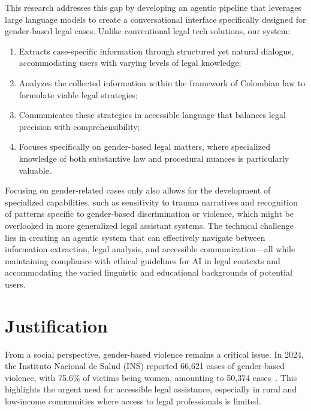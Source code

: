 This research addresses this gap by developing an agentic pipeline 
that leverages large language models to create a conversational 
interface specifically designed for gender-based legal cases. 
Unlike conventional legal tech solutions, our system:
\begin{enumerate}
\item Extracts case-specific information through structured yet natural dialogue, accommodating users with varying levels of legal knowledge;
\item Analyzes the collected information within the framework of Colombian law to formulate viable legal strategies;
\item Communicates these strategies in accessible language that balances legal precision with comprehensibility;
\item Focuses specifically on gender-based legal matters, where specialized knowledge of both substantive law and procedural nuances is particularly valuable.
\end{enumerate}
Focusing on gender-related cases only also allows for the development of specialized capabilities, 
such as sensitivity to trauma narratives and recognition of patterns specific to 
gender-based discrimination or violence, which might be overlooked in more generalized 
legal assistant systems.
The technical challenge lies in creating an agentic system 
that can effectively navigate between information extraction, 
legal analysis, and accessible communication—all while 
maintaining compliance with ethical guidelines for AI in 
legal contexts and accommodating the varied 
linguistic and educational backgrounds of potential users.
\section{Justification}

From a social perspective, gender-based violence remains a 
critical issue. In 2024, the Instituto Nacional de Salud (INS) reported 66,621 cases of gender-based violence, with 75.6\% of victims being women, amounting to 50,374 cases~\cite{ins2024}. 
This highlights the urgent need for accessible legal assistance, 
especially in rural and low-income communities where access to 
legal professionals is limited.

